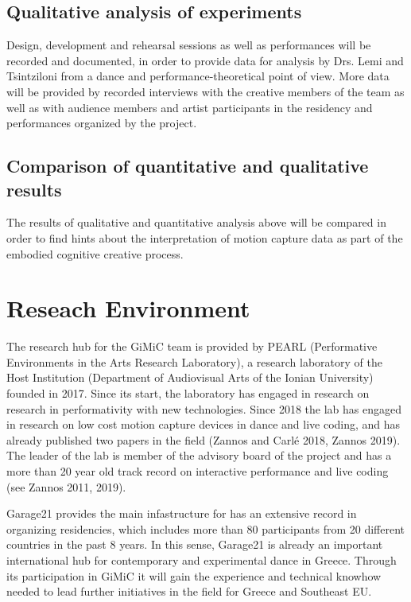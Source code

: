 \subsection{Qualitative analysis of experiments}
\label{sec:org7d0e490}
Design, development and rehearsal sessions as well as performances will be recorded and documented, in order to provide data for analysis by Drs. Lemi and Tsintziloni from a dance and performance-theoretical point of view.  More data will be provided by recorded interviews with the creative members of the team as well as with audience members and artist participants in the residency and performances organized by the project. 

\subsection{Comparison of quantitative and qualitative results}
\label{sec:org23aeb4b}
The results of qualitative and quantitative analysis above will be compared in order to find hints about the interpretation of motion capture data as part of the embodied cognitive creative process.

\section{Reseach Environment}
\label{sec:orgdc40840}
The research hub for the GiMiC team is provided by PEARL (Performative Environments in the Arts Research Laboratory), a research laboratory of the Host Institution (Department of Audiovisual Arts of the Ionian University) founded in 2017.  Since its start, the laboratory has engaged in research on research in performativity with new technologies.  Since 2018 the lab has engaged in research on low cost motion capture devices in dance and live coding, and has already published two papers in the field (Zannos and Carlé 2018, Zannos 2019). The leader of the lab is member of the advisory board of the project and has a more than 20 year old track record on interactive performance and live coding (see Zannos 2011, 2019). 

Garage21 provides the main infastructure for  has an extensive record in organizing residencies, which includes more than 80 participants from 20 different countries in the past 8 years.  In this sense, Garage21 is already an important international hub for contemporary and experimental dance in Greece.  Through its participation in GiMiC it will gain the experience and technical knowhow needed to lead further initiatives in the field for Greece and Southeast EU. 

